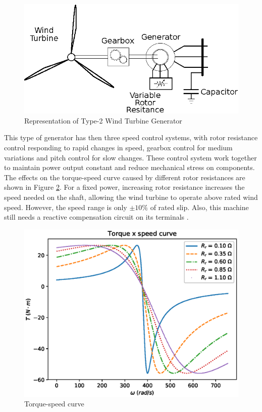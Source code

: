 \begin{figure}[h]
	\caption{Representation of Type-2 Wind Turbine Generator}
	\begin{center}
		\includegraphics[scale=1]{Images/Type2WTG.eps}
	\end{center}
	\label{fig: WTG2}
\end{figure}

This type of generator has then three speed control systems, with rotor resistance control responding to rapid changes in speed, gearbox control for medium variations and pitch control for slow changes. These control system work together to maintain power output constant and reduce mechanical stress on components. The effects on the torque-speed curve caused by different rotor resistances are shown in Figure \ref{fig: Tw}. For a fixed power, increasing rotor resistance increases the speed needed on the shaft, allowing the wind turbine to operate above rated wind speed. However, the speed range is only $\pm 10\%$ of rated slip. Also, this machine still needs a reactive compensation circuit on its terminals \cite{Muljadi2010}.

\begin{figure}[h]
	\caption{Torque-speed curve}
	\begin{center}
		\includegraphics[scale=.7]{Images/Tw_curve.eps}
	\end{center}
	\label{fig: Tw}
\end{figure}

